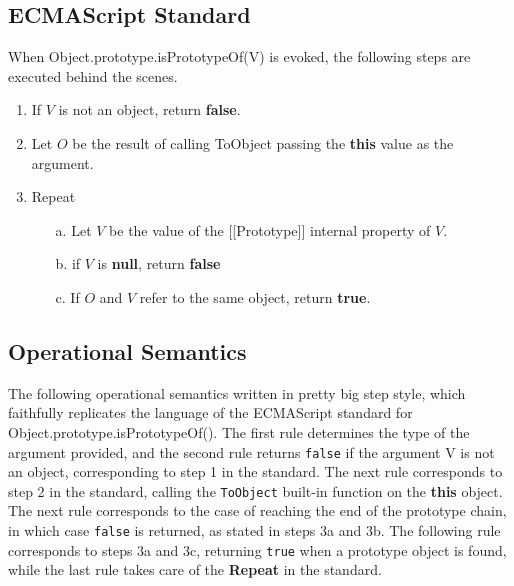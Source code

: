 \documentclass[a4paper,11pt,twoside]{report}
\begin{document}
\subsection{ECMAScript Standard}
When Object.prototype.isPrototypeOf(V) is evoked, the following steps are executed behind the scenes.

\begin{enumerate}
\item If $V$ is not an object, return \textbf{false}.
\item Let $O$ be the result of calling ToObject passing the \textbf{this} value as the argument.
\item Repeat
\begin{enumerate}
\item[a.] Let $V$ be the value of the [[Prototype]] internal property of $V$.
\item[b.] if $V$ is \textbf{null}, return \textbf{false}
\item[c.] If $O$ and $V$ refer to the same object, return \textbf{true}.
\end{enumerate}
\end{enumerate}

\subsection{Operational Semantics}
The following operational semantics written in pretty big step style, which faithfully replicates the language of the ECMAScript standard for Object.prototype.isPrototypeOf(). The first rule determines the type of the argument provided, and the second rule returns \texttt{false} if the argument V is not an object, corresponding to step 1 in the standard. The next rule corresponds to step 2 in the standard, calling the \texttt{ToObject} built-in function on the \textbf{this} object. The next rule corresponds to the case of reaching the end of the prototype chain, in which case \texttt{false} is returned, as stated in steps 3a and 3b. The following rule corresponds to steps 3a and 3c, returning \texttt{true} when a prototype object is found, while the last rule takes care of the \textbf{Repeat} in the standard. 
\end{document}
